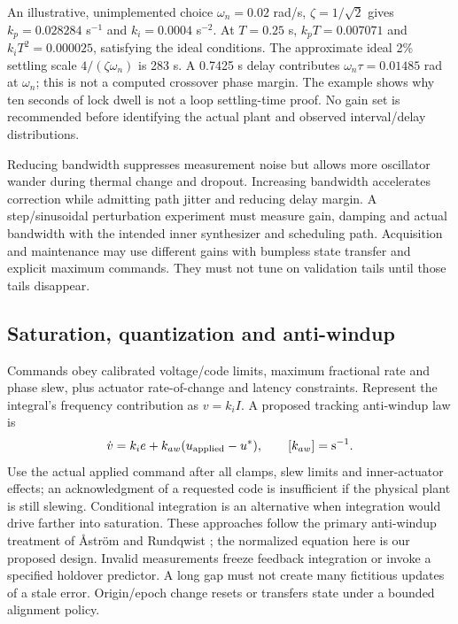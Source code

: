 \documentclass[11pt,letterpaper]{article}
\begin{document}
An illustrative, unimplemented choice $\omega_n=0.02$ rad/s, $\zeta=1/\sqrt2$ gives $k_p=0.028284$ s$^{-1}$ and $k_i=0.0004$ s$^{-2}$. At $T=0.25$ s, $k_pT=0.007071$ and $k_iT^2=0.000025$, satisfying the ideal conditions. The approximate ideal 2\% settling scale $4/(\zeta\omega_n)$ is 283 s. A 0.7425 s delay contributes $\omega_n\tau=0.01485$ rad at $\omega_n$; this is not a computed crossover phase margin. The example shows why ten seconds of lock dwell is not a loop settling-time proof. No gain set is recommended before identifying the actual plant and observed interval/delay distributions.

Reducing bandwidth suppresses measurement noise but allows more oscillator wander during thermal change and dropout. Increasing bandwidth accelerates correction while admitting path jitter and reducing delay margin. A step/sinusoidal perturbation experiment must measure gain, damping and actual bandwidth with the intended inner synthesizer and scheduling path. Acquisition and maintenance may use different gains with bumpless state transfer and explicit maximum commands. They must not tune on validation tails until those tails disappear.

\subsection{Saturation, quantization and anti-windup}
Commands obey calibrated voltage/code limits, maximum fractional rate and phase slew, plus actuator rate-of-change and latency constraints. Represent the integral's frequency contribution as $v=k_iI$. A proposed tracking anti-windup law is
\begin{equation}
 \dot v=k_i e+k_{aw}(u_{\rm applied}-u^*),\qquad [k_{aw}]=\mathrm{s}^{-1}.\label{eq:antiwindup}
\end{equation}
Use the actual applied command after all clamps, slew limits and inner-actuator effects; an acknowledgment of a requested code is insufficient if the physical plant is still slewing. Conditional integration is an alternative when integration would drive farther into saturation. These approaches follow the primary anti-windup treatment of \AA str\"om and Rundqwist \cite{windup}; the normalized equation here is our proposed design. Invalid measurements freeze feedback integration or invoke a specified holdover predictor. A long gap must not create many fictitious updates of a stale error. Origin/epoch change resets or transfers state under a bounded alignment policy.
\end{document}
